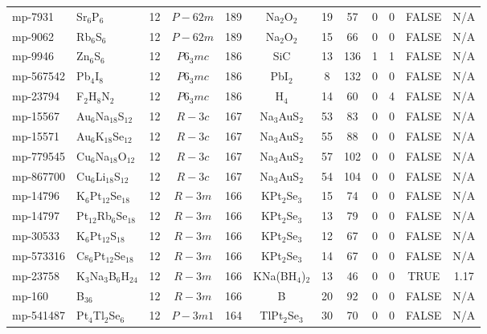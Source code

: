 {\begin{longtable}{llcccccccccc}
    mp-7931 & Sr$_{6}$P$_{6}$ & 12    & $P-62m$ & 189   & Na$_{2}$O$_{2}$ & 19    & 57    & 0     & 0     & FALSE & N/A \\
    mp-9062 & Rb$_{6}$S$_{6}$ & 12    & $P-62m$ & 189   & Na$_{2}$O$_{2}$ & 15    & 66    & 0     & 0     & FALSE & N/A \\
    mp-9946 & Zn$_{6}$S$_{6}$ & 12    & $P6_3mc$ & 186   & SiC   & 13    & 136   & 1     & 1     & FALSE & N/A \\
    mp-567542 & Pb$_{4}$I$_{8}$ & 12    & $P6_3mc$ & 186   & PbI$_{2}$ & 8     & 132   & 0     & 0     & FALSE & N/A \\
    mp-23794 & F$_{2}$H$_{8}$N$_{2}$ & 12    & $P6_3mc$ & 186   & H$_{4}$ & 14    & 60    & 0     & 4     & FALSE & N/A \\
    mp-15567 & Au$_{6}$Na$_{18}$S$_{12}$ & 12    & $R-3c$ & 167   & Na$_{3}$AuS$_{2}$ & 53    & 83    & 0     & 0     & FALSE & N/A \\
    mp-15571 & Au$_{6}$K$_{18}$Se$_{12}$ & 12    & $R-3c$ & 167   & Na$_{3}$AuS$_{2}$ & 55    & 88    & 0     & 0     & FALSE & N/A \\
    mp-779545 & Cu$_{6}$Na$_{18}$O$_{12}$ & 12    & $R-3c$ & 167   & Na$_{3}$AuS$_{2}$ & 57    & 102   & 0     & 0     & FALSE & N/A \\
    mp-867700 & Cu$_{6}$Li$_{18}$S$_{12}$ & 12    & $R-3c$ & 167   & Na$_{3}$AuS$_{2}$ & 54    & 104   & 0     & 0     & FALSE & N/A \\
    mp-14796 & K$_{6}$Pt$_{12}$Se$_{18}$ & 12    & $R-3m$ & 166   & KPt$_{2}$Se$_{3}$ & 15    & 74    & 0     & 0     & FALSE & N/A \\
    mp-14797 & Pt$_{12}$Rb$_{6}$Se$_{18}$ & 12    & $R-3m$ & 166   & KPt$_{2}$Se$_{3}$ & 13    & 79    & 0     & 0     & FALSE & N/A \\
    mp-30533 & K$_{6}$Pt$_{12}$S$_{18}$ & 12    & $R-3m$ & 166   & KPt$_{2}$Se$_{3}$ & 12    & 67    & 0     & 0     & FALSE & N/A \\
    mp-573316 & Cs$_{6}$Pt$_{12}$Se$_{18}$ & 12    & $R-3m$ & 166   & KPt$_{2}$Se$_{3}$ & 14    & 67    & 0     & 0     & FALSE & N/A \\
    mp-23758 & K$_{3}$Na$_{3}$B$_{6}$H$_{24}$ & 12    & $R-3m$ & 166   & KNa(BH$_{4}$)$_{2}$ & 13    & 46    & 0     & 0     & TRUE  & 1.17  \\
    mp-160 & B$_{36}$ & 12    & $R-3m$ & 166   & B     & 20    & 92    & 0     & 0     & FALSE & N/A \\
    mp-541487 & Pt$_{4}$Tl$_{2}$Se$_{6}$ & 12    & $P-3m1$ & 164   & TlPt$_{2}$Se$_{3}$ & 30    & 70    & 0     & 0     & FALSE & N/A \\

\end{longtable}}
